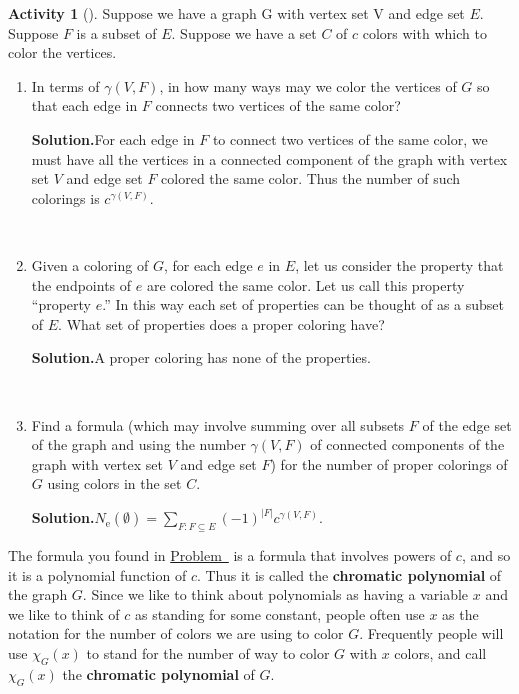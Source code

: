 \documentclass[10pt,]{book}
\newcommand{\terminology}[1]{\textbf{#1}}
\theoremstyle{plain}
\theoremstyle{definition}
\newtheorem{activity}[project]{Activity}
\numberwithin{equation}{chapter}
\begin{document}
\begin{activity}[]\label{activity-114}
Suppose we have a graph G with vertex set V and edge set \(E\). Suppose \(F\) is a subset of \(E\). Suppose we have a set \(C\) of \(c\) colors with which to color the vertices.%
~\par
\begin{enumerate}[label=(\alph*)]
 \item In terms of \(\gamma(V,F)\), in how many ways may we color the vertices of \(G\) so that each edge in \(F\) connects two vertices of the same color?%
\par\medskip\noindent%
\textbf{Solution.}\quad For each edge in \(F\) to connect two vertices of the same color, we must have all the vertices in a connected component of the graph with vertex set \(V\) and edge set \(F\) colored the same color. Thus the number of such colorings is \(c^{\gamma(V,F)}\).%

~\par
\item Given a coloring of \(G\), for each edge \(e\) in \(E\), let us consider the property that the endpoints of \(e\) are colored the same color.  Let us call this property ``property \(e\).''  In this way each set of properties can be thought of as a subset of \(E\).  What set of properties does a proper coloring have?%
\par\medskip\noindent%
\textbf{Solution.}\quad A proper coloring has none of the properties.%

~\par
\item Find a formula (which may involve summing over all subsets \(F\) of the edge set of the graph and using the number \(\gamma(V,F)\) of connected components of the graph with vertex set \(V\) and edge set \(F\)) for the number of proper colorings of \(G\) using colors in the set \(C\).%
\par\medskip\noindent%
\textbf{Solution.}\quad \(N_{\mbox{e} }(\emptyset)=\sum_{F:F\subseteq E}
(-1)^{|F|}c^{\gamma(V,F)}.\)%

\end{enumerate}
\end{activity}
The formula you found in \hyperref[chromaticpoly]{Problem~} is a formula that involves powers of \(c\), and so it is a polynomial function of \(c\). Thus it is called the \terminology{chromatic polynomial} of the graph \(G\). Since we like to think about polynomials as having a variable \(x\) and we like to think of \(c\) as standing for some constant, people often use \(x\) as the notation for the number of colors we are using to color \(G\). Frequently people will use \(\chi_G(x)\) to stand for the number of way to color \(G\) with \(x\) colors, and call \(\chi_G(x)\) the \terminology{chromatic polynomial} of \(G\).%
\end{document}
